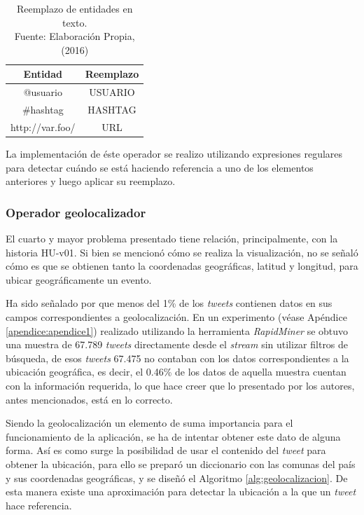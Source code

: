 \begin{table}[H]
\centering
\caption[Reemplazo de entidades en texto.]{Reemplazo de entidades en texto.\\Fuente: Elaboración Propia, (2016)}
\label{tab:reemplazosDeEntidades}
\begin{tabular}{|c|c|}
\hline
\textbf{Entidad} & \textbf{Reemplazo} \\ \hline
@usuario         & USUARIO            \\ \hline
\#hashtag        & HASHTAG            \\ \hline
http://var.foo/  & URL                \\ \hline
\end{tabular}
\end{table}

La implementación de éste operador se realizo utilizando expresiones regulares para detectar cuándo se está haciendo referencia a uno de los elementos anteriores y luego aplicar su reemplazo.

\subsubsection*{Operador geolocalizador}
\label{subsubsec:4op}

El cuarto y mayor problema presentado tiene relación, principalmente, con la historia HU-v01. Si bien se mencionó cómo se realiza la visualización, no se señaló cómo es que se obtienen tanto la coordenadas geográficas, latitud y longitud, para ubicar geográficamente un evento.

Ha sido señalado por \cite{ChatoSurvey} que menos del 1\% de los \textit{tweets} contienen datos en sus campos correspondientes a geolocalización. En un experimento (véase Apéndice \ref{apendice:apendice1}) realizado utilizando la herramienta \textit{RapidMiner} se obtuvo una muestra de 67.789 \textit{tweets} directamente desde el \textit{stream} sin utilizar filtros de búsqueda, de esos \textit{tweets} 67.475 no contaban con los datos correspondientes a la ubicación geográfica, es decir, el 0.46\% de los datos de aquella muestra cuentan con la información requerida, lo que hace creer que lo presentado por los autores, antes mencionados, está en lo correcto.

Siendo la geolocalización un elemento de suma importancia para el funcionamiento de la aplicación, se ha de intentar obtener este dato de alguna forma. Así es como surge la posibilidad de usar el contenido del \textit{tweet} para obtener la ubicación, para ello se preparó un diccionario con las comunas del país y sus coordenadas geográficas, \cite{ubicacionesChile} y se diseñó el Algoritmo \ref{alg:geolocalizacion}. De esta manera existe una aproximación para detectar la ubicación a la que un \textit{tweet} hace referencia.\\

